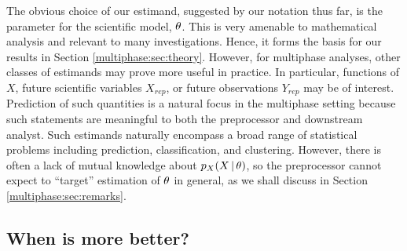 The obvious choice of our estimand, suggested by our notation thus far, is the parameter for the scientific model, $\theta$.
This is very amenable to mathematical analysis and relevant to many investigations.
Hence, it forms the basis for our results in Section \ref{multiphase:sec:theory}.
However, for multiphase analyses, other classes of estimands may prove more useful in practice.
In particular, functions of $X$, future scientific variables $X_{rep}$, or future observations $Y_{rep}$ may be of interest.
Prediction of such quantities is a natural focus in the multiphase setting because such statements are meaningful to both the preprocessor and downstream analyst.
Such estimands naturally encompass a broad range of statistical problems including prediction, classification, and clustering.
However, there is often a lack of mutual knowledge about $p_X(X \, | \, \theta)$, so the preprocessor cannot expect to ``target'' estimation of $\theta$ in general, as we shall discuss in Section \ref{multiphase:sec:remarks}.


\subsection{When is more better?}
\label{multiphase:sec:riskmonotone}

